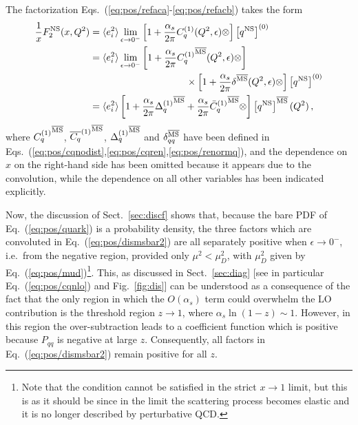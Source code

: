 The factorization Eqs.~(\ref{eq:pos/refaca}-\ref{eq:pos/refacb}) takes the
form
\begin{align}
  \frac{1}{x} F_2^{{\textrm{NS}}}(x,Q^2)&= \langle e_i^2\rangle
\lim_{\epsilon\to
  0^-}\left[1
    +\frac{\alpha_s}{2\pi} C_{q}^{(1)}(Q^2,\epsilon) \otimes \right] 
    \left[{q^{{\textrm{NS}}}}\right]^{(0)} \label{eq:pos/dismsbar} \\
&= \langle e_i^2\rangle
\lim_{\epsilon\to
  0^-}\left[1 +\frac{\alpha_s}{2\pi} {C_{q}^{(1)}}^{{\overline{\textrm{MS}}}}(Q^2, \epsilon) \otimes \right]
  \nonumber\\
  &\qquad\qquad\qquad\qquad\qquad
    \times\left[1 +\frac{\alpha_s}{2\pi} \delta^{{\overline{\textrm{MS}}}} (Q^2,\epsilon) \otimes \right]
     \left[{q^{{\textrm{NS}}}}\right]^{(0)} \label{eq:pos/dismsbar1} \\
    &=  \langle e_i^2\rangle
\left[1+ \frac{\alpha_s}{2\pi} {\Delta^{(1)}_q}^{{\overline{\textrm{MS}}}}
  +\frac{\alpha_s}{2\pi}    {\bar{C}_{q}^{(1)}{}}^{{\overline{\textrm{MS}}}} \otimes
  \right] 
     \left[{q^{{\textrm{NS}}}}\right]^{{\overline{\textrm{MS}}}}(Q^2) \,, \label{eq:pos/dismsbar2}
\end{align}
where $ {C_{q}^{(1)}}^{{\overline{\textrm{MS}}}}$,  ${\overline{C_{q}}^{(1)}}^{{\overline{\textrm{MS}}}}$,
${\Delta^{(1)}_q}^{{\overline{\textrm{MS}}}}$ and $ \delta_{qq}^{{\overline{\textrm{MS}}}} $ have been
defined in Eqs.~(\ref{eq:pos/cqnodist},\ref{eq:pos/cqren},\ref{eq:pos/renormq}),
and the dependence on $x$ on the  right-hand side has been omitted
because it appears due to the convolution, while the dependence on all
other variables has been indicated explicitly.

Now, the discussion of Sect.~\ref{sec:discf} shows that, because the
bare PDF of Eq.~(\ref{eq:pos/quark}) is a probability density, the three
factors which are convoluted in Eq.~(\ref{eq:pos/dismsbar2}) are all
separately positive when $\epsilon \to 0^-$, i.e.\ from the negative
region, provided only $\mu^2< \mu_D^2$, with $\mu_D^2$ given by
Eq.~(\ref{eq:pos/mud})\footnote{Note that the condition cannot be satisfied in
the strict $x\to1$ limit, but this is as it should be since in the
limit the scattering process becomes elastic and it is no longer
described by perturbative QCD.}.
This, as discussed in Sect.~\ref{sec:diag} [see in particular
Eq.~(\ref{eq:pos/cqnlo}) and Fig.~\ref{fig:dis}]
can be understood as a consequence of the fact that the only region in
which the $O(\alpha_s)$ term could overwhelm the LO contribution is
the threshold region $z\to 1$, where $\alpha_s\ln(1-z)\sim1$.
However, in this region the \msbar{} over-subtraction leads to a
coefficient function which is positive because $P_{qq}$ is negative at
large $z$. Consequently, all factors in  Eq.~(\ref{eq:pos/dismsbar2})
remain positive for all $z$.

